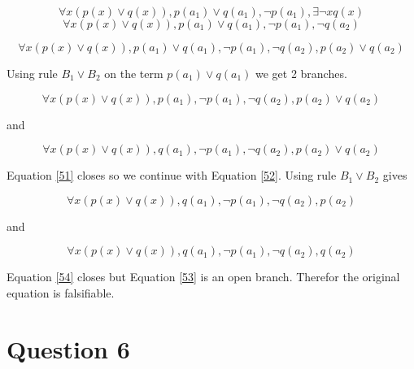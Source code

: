 \documentclass[10pt,a4paper]{article}
\begin{document}
 \begin{equation}
 \forall x (p(x) \vee q(x)),p(a_1)\vee q(a_1) ,\neg p(a_1), \exists \neg x q(x)
\end{equation}
 \begin{equation}
 \forall x (p(x) \vee q(x)),p(a_1)\vee q(a_1) ,\neg p(a_1),  \neg q(a_2)
\end{equation}

 \begin{equation}
 \forall x (p(x) \vee q(x)),p(a_1)\vee q(a_1) ,\neg p(a_1),  \neg q(a_2), p(a_2)\vee q(a_2)
\end{equation}

 Using rule $B_1 \vee B_2$ on the term $p(a_1)\vee q(a_1)$ we get 2 branches.
 
  \begin{equation}
  \label{51}
 \forall x (p(x) \vee q(x)),p(a_1) ,\neg p(a_1),  \neg q(a_2), p(a_2)\vee q(a_2)
\end{equation}

and 

 \begin{equation}
 \label{52}
 \forall x (p(x) \vee q(x)), q(a_1) ,\neg p(a_1),  \neg q(a_2), p(a_2)\vee q(a_2)
\end{equation}
 
Equation \ref{51} closes so we continue with Equation \ref{52}. Using rule $B_1 \vee B_2$ gives 

 \begin{equation}
 \label{53}
 \forall x (p(x) \vee q(x)), q(a_1) ,\neg p(a_1),  \neg q(a_2), p(a_2)
\end{equation} 

and

\begin{equation}
 \label{54}
 \forall x (p(x) \vee q(x)), q(a_1) ,\neg p(a_1),  \neg q(a_2), q(a_2)
\end{equation}

Equation \ref{54} closes but Equation \ref{53} is an open branch. Therefor the original equation is falsifiable.

 
 \section{Question 6}
 
\end{document}
